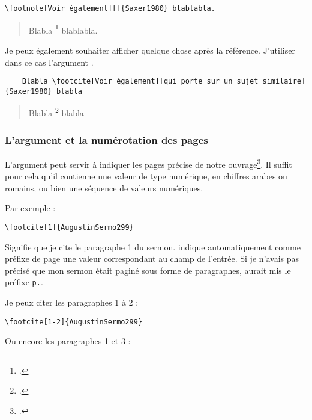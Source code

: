 \begin{verbatim}
\footnote[Voir également][]{Saxer1980} blablabla.
\end{verbatim}

\begin{quotation}
Blabla \footcite[Voir également][]{Saxer1980} blablabla.
\end{quotation}



Je peux également souhaiter afficher quelque chose après la référence. J'utiliser dans ce cas l'argument .

\begin{verbatim}
	Blabla \footcite[Voir également][qui porte sur un sujet similaire]{Saxer1980} blabla
\end{verbatim}

\begin{quotation}

	Blabla \footcite[Voir également][qui porte sur un sujet similaire]{Saxer1980} blabla
\end{quotation}

\subsubsection{L'argument  et la numérotation des pages}

L'argument  peut servir à indiquer les pages précise de notre ouvrage\footcite[On consultera pour plus de détails : ]{BibLaTeX}. Il suffit pour cela qu'il contienne une valeur de type numérique, en chiffres arabes ou romains, ou bien une séquence de valeurs numériques.

Par exemple : 
\begin{verbatim}
\footcite[1]{AugustinSermo299}
\end{verbatim}

Signifie que je cite le paragraphe 1 du sermon.  indique automatiquement comme préfixe de page une valeur correspondant au champ  de l'entrée. Si je n'avais pas précisé que mon sermon était paginé sous forme de paragraphes,  aurait mis le préfixe \verb|p.|.

Je peux citer les paragraphes 1 à 2 :

\begin{verbatim}
\footcite[1-2]{AugustinSermo299}
\end{verbatim}

Ou encore les paragraphes 1 et 3 :

